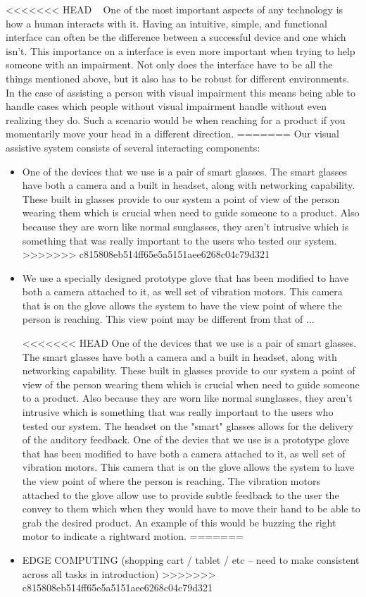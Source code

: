 <<<<<<< HEAD
~\cite{something}
One of the most important aspects of any technology is how a human interacts with it. Having an intuitive, simple, and functional interface can often be the difference between a successful device and one which isn't. This importance on a interface is even more important when trying to help someone with an impairment. Not only does the interface have to be all the things mentioned above, but it also has to be robust for different environments. In the case of assisting a person with visual impairment this means being able to handle cases which people without visual impairment handle without even realizing they do. Such a scenario would be when reaching for a product if you momentarily move your head in a different direction.
=======
Our visual assistive system consists of several interacting components: 
\begin{itemize}
\item One of the devices that we use is a pair of smart glasses. The smart
glasses have both a camera and a built in headset, along with
networking capability. These built in glasses provide to our system a
point of view of the person wearing them which is crucial when need to
guide someone to a product. Also because they are worn like normal
sunglasses, they aren't intrusive which is something that was really
important to the users who tested our system.
>>>>>>> c815808eb514ff65e5a5151aee6268c04c79d321

\item We use a specially designed prototype glove that has been
modified to have both a camera attached to it, as well set of
vibration motors. This camera that is on the glove allows the system
to have the view point of where the person is reaching. This view
point may be different from that of ...

<<<<<<< HEAD
One of the devices that we use is a pair of smart glasses. The smart glasses have both a camera and a built in headset, along with networking capability. These built in glasses provide to our system a point of view of the person wearing them which is crucial when need to guide someone to a product. Also because they are worn like normal sunglasses, they aren't intrusive which is something that was really important to the users who tested our system. The headset on the "smart" glasses allows for the delivery of the auditory feedback.
One of the devies that we use is a prototype glove that has been modified to have both a camera attached to it, as well set of vibration motors. This camera that is on the glove allows the system to have the view point of where the person is reaching. The vibration motors attached to the glove allow use to provide subtle feedback to the user the convey to them which when they would have to move their hand to be able to grab the desired product. An example of this would be buzzing the right motor to indicate a rightward motion.
=======
\item EDGE COMPUTING (shopping cart / tablet / etc -- need to make consistent across all tasks in introduction)
>>>>>>> c815808eb514ff65e5a5151aee6268c04c79d321


\end{itemize}
